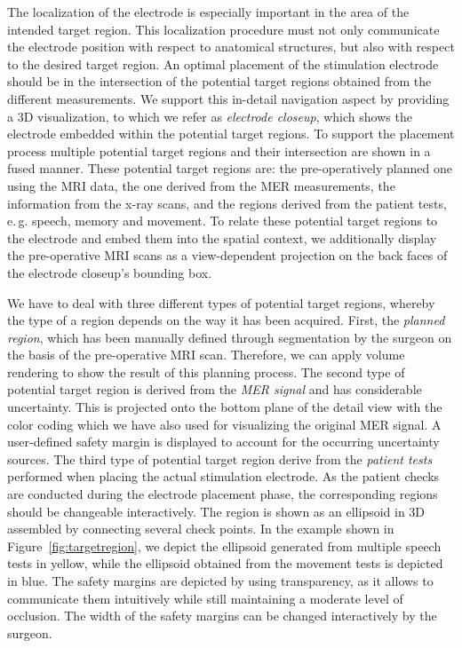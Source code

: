 \documentclass[review]{vgtc}                 %
\begin{document}
The localization of the electrode is especially important in the area of the intended target region. This localization procedure must not only communicate the electrode position with respect to anatomical structures, but also with respect to the desired target region. An optimal placement of the stimulation electrode should be in the intersection of the potential target regions obtained from the different measurements. We support this in-detail navigation aspect by providing a 3D visualization, to which we refer as \emph{electrode closeup}, which shows the electrode embedded within the potential target regions. To support the placement process multiple potential target regions and their intersection are shown in a fused manner. These potential target regions are: the pre-operatively planned one using the MRI data, the one derived from the MER measurements, the information from the x-ray scans, and the regions derived from the patient tests, e.\,g. speech, memory and movement. To relate these potential target regions to the electrode and embed them into the spatial context, we additionally display the pre-operative MRI scans as a view-dependent projection on the back faces of the electrode closeup's bounding box. %

We have to deal with three different types of potential target regions, whereby the type of a region depends on the way it has been acquired. First, the \emph{planned region}, which has been manually defined through segmentation by the surgeon on the basis of the pre-operative MRI scan. Therefore, we can apply volume rendering to show the result of this planning process. The second type of potential target region is derived from the \emph{MER signal} and has considerable uncertainty. This is projected onto the bottom plane of the detail view with the color coding which we have also used for visualizing the original MER signal. A user-defined safety margin is displayed to account for the occurring uncertainty sources. The third type of potential target region derive from the \emph{patient tests} performed when placing the actual stimulation electrode. As the patient checks are conducted during the electrode placement phase, the corresponding regions should be changeable interactively. The region is shown as an ellipsoid in 3D assembled by connecting several check points. In the example shown in Figure~\ref{fig:targetregion}, we depict the ellipsoid generated from multiple speech tests in yellow, while the ellipsoid obtained from the movement tests is depicted in blue. The safety margins are depicted by using transparency, as it allows to communicate them intuitively while still maintaining a moderate level of occlusion. The width of the safety margins can be changed interactively by the surgeon.
\end{document}
